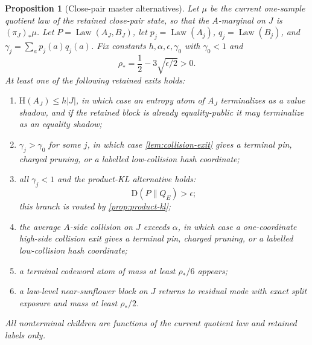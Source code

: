 \documentclass[11pt]{article}
\newcommand{\Cref}[1]{\ref{#1}}
\newtheorem{proposition}[theorem]{Proposition}
\theoremstyle{remark}
\newcommand{\HH}{\mathrm H}
\newcommand{\KL}{\mathrm D}
\newcommand{\Law}{\operatorname{Law}}
\begin{document}
\begin{proposition}[Close-pair master alternatives]\label{prop:close-pair}
Let $\mu$ be the current one-sample quotient law of the retained close-pair
state, so that the $A$-marginal on $J$ is $(\pi_J)_*\mu$.  Let
$P=\Law(A_J,B_J)$, let $p_j=\Law(A_j)$, $q_j=\Law(B_j)$, and
$\gamma_j=\sum_a p_j(a)q_j(a)$.  Fix constants
$h,\alpha,\epsilon,\gamma_0$ with $\gamma_0<1$ and
\[
        \rho_*=\frac{1}{2}-3\sqrt{\epsilon/2}>0.
\]
At least one of the following retained exits holds:
\begin{enumerate}[label=\textup{(\arabic*)}]
\item $\HH(A_J)\le h|J|$, in which case an entropy atom of $A_J$ terminalizes as a value shadow, and if the retained block is already equality-public it may terminalize as an equality shadow;
\item $\gamma_j>\gamma_0$ for some $j$, in which case \Cref{lem:collision-exit} gives a terminal pin, charged pruning, or a labelled low-collision hash coordinate;
\item all $\gamma_j<1$ and the product-KL alternative holds:
\[
        \KL(P\|Q_E)>\epsilon;
\]
this branch is routed by \Cref{prop:product-kl};
\item the average $A$-side collision on $J$ exceeds $\alpha$, in which case a
one-coordinate high-side collision exit gives a terminal pin, charged pruning,
or a labelled low-collision hash coordinate;
\item a terminal codeword atom of mass at least $\rho_*/6$ appears;
\item a law-level near-sunflower block on $J$ returns to residual mode with exact split exposure and mass at least $\rho_*/2$.
\end{enumerate}
All nonterminal children are functions of the current quotient law and retained labels only.
\end{proposition}
\end{document}
